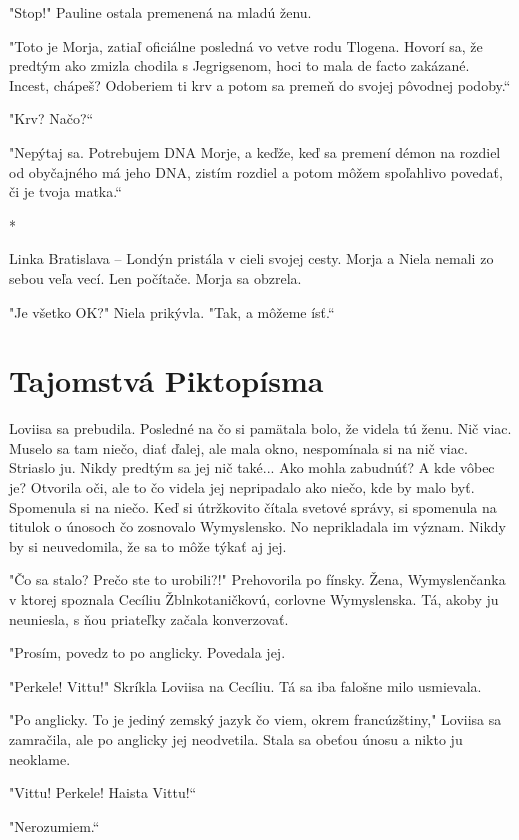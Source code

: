 \documentclass{book}
\begin{document}
"Stop!"$ $ Pauline ostala premenená na mladú ženu.

"Toto je Morja, zatiaľ oficiálne posledná vo vetve rodu Tlogena. Hovorí sa, že predtým ako zmizla chodila s Jegrigsenom, hoci to mala de facto zakázané. Incest, chápeš? Odoberiem ti krv a potom sa premeň do svojej pôvodnej podoby.“

"Krv? Načo?“

"Nepýtaj sa. Potrebujem DNA Morje, a keďže, keď sa premení démon na rozdiel od obyčajného má jeho DNA, zistím rozdiel a potom môžem spoľahlivo povedať, či je tvoja matka.“

\begin{center}
*
\end{center}

Linka Bratislava – Londýn pristála v cieli svojej cesty. Morja a Niela nemali zo sebou veľa vecí. Len počítače. Morja sa obzrela.

"Je všetko OK?"$ $ Niela prikývla. "Tak, a môžeme ísť.“

\chapter{Tajomstvá Piktopísma}

Loviisa sa prebudila. Posledné na čo si pamätala bolo, že videla tú ženu. Nič viac. Muselo sa tam niečo, diať ďalej, ale mala okno, nespomínala si na nič viac. Striaslo ju. Nikdy predtým sa jej nič také... Ako mohla zabudnúť? A kde vôbec je? Otvorila oči, ale to čo videla jej nepripadalo ako niečo, kde by malo byť. Spomenula si na niečo. Keď si útržkovito čítala svetové správy, si spomenula na titulok o únosoch čo zosnovalo Wymyslensko. No neprikladala im význam. Nikdy by si neuvedomila, že sa to môže týkať aj jej.

"Čo sa stalo? Prečo ste to urobili?!"$ $ Prehovorila po fínsky. Žena, Wymyslenčanka v ktorej spoznala Cecíliu Žblnkotaničkovú, corlovne Wymyslenska. Tá, akoby ju neuniesla, s ňou priateľky začala konverzovať.

"Prosím, povedz to po anglicky. Povedala jej.

"Perkele! Vittu!"$ $ Skríkla Loviisa na Cecíliu. Tá sa iba falošne milo usmievala.

"Po anglicky. To je jediný zemský jazyk čo viem, okrem francúzštiny,"$ $ Loviisa sa zamračila, ale po anglicky jej neodvetila. Stala sa obeťou únosu a nikto ju neoklame.

"Vittu! Perkele! Haista Vittu!“

"Nerozumiem.“
\end{document}
